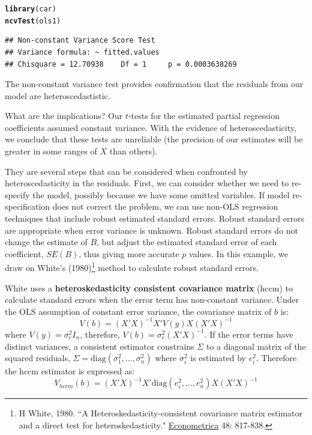 \documentclass[11pt,openany]{book}
\makeatletter
\newcommand{\hlstd}[1]{\textcolor[rgb]{0.345,0.345,0.345}{#1}}%
\newcommand{\hlkwd}[1]{\textcolor[rgb]{0.737,0.353,0.396}{\textbf{#1}}}%
\newenvironment{kframe}{%
 \def\at@end@of@kframe{}%
 \ifinner\ifhmode%
  \def\at@end@of@kframe{\end{minipage}}%
  \begin{minipage}{\columnwidth}%
 \fi\fi%
 \def\FrameCommand##1{\hskip\@totalleftmargin \hskip-\fboxsep
 \colorbox{shadecolor}{##1}\hskip-\fboxsep
     \hskip-\linewidth \hskip-\@totalleftmargin \hskip\columnwidth}%
 \MakeFramed {\advance\hsize-\width
   \@totalleftmargin\z@ \linewidth\hsize
   \@setminipage}}%
 {\par\unskip\endMakeFramed%
 \at@end@of@kframe}
\newenvironment{knitrout}{}{} %
\renewenvironment{knitrout}{\begin{singlespace}}{\end{singlespace}}
\makeatother
\begin{document}
\begin{knitrout}
\color{fgcolor}\begin{kframe}
\begin{alltt}
\hlkwd{library}\hlstd{(car)}
\hlkwd{ncvTest}\hlstd{(ols1)}
\end{alltt}
\begin{verbatim}
## Non-constant Variance Score Test 
## Variance formula: ~ fitted.values 
## Chisquare = 12.70938    Df = 1     p = 0.0003638269
\end{verbatim}
\end{kframe}
\end{knitrout}
\noindent The non-constant variance test provides confirmation that the residuals from our model are heteroscedastistic.

What are the implications? Our $t$-tests for the estimated partial regression  coefficients assumed constant variance. With the evidence of heteroscedasticity, we conclude that these tests are unreliable (the precision of our estimates will be greater in some ranges of $X$ than others). 

They are several steps that can be considered when confronted by heteroscedasticity in the residuals. First, we can consider whether we need to re-specify the model, possibly because we have some omitted variables. If model re-specification does not correct the problem, we can use non-OLS regression techniques that include robust estimated  standard errors.  Robust standard errors are appropriate when error variance is unknown. Robust standard errors do not change the estimate of $B$, but adjust the estimated standard error of each coefficient, $SE(B)$, thus giving more accurate $p$ values. In this example, we draw on White's (1980)\footnote{H White,  1980.  ``A Heteroskedasticity-consistent covariance matrix estimator and a direct test for heteroskedasticity." \underline{Econometrica} 48: 817-838.} method to calculate robust standard errors.  

White uses a \textbf{heteroskedasticity consistent covariance matrix} (hccm) to calculate standard errors when the error term has non-constant variance. Under the OLS assumption of constant error variance, the covariance matrix of $b$ is:
\begin{equation*}
  V(b) = (X'X)^{-1} X'V(y)X(X'X)^{-1}
\end{equation*}
\noindent where $V(y)=\sigma^{2}_{e}I_n$, therefore,
$V(b)=\sigma^{2}_{e}(X'X)^{-1}$. If the error terms have distinct
variances, a consistent estimator constrains $\Sigma$ to a diagonal
matrix of the squared residuals,
$\Sigma=\text{diag}(\sigma^2_1,\ldots,\sigma^2_n)$ where $\sigma^2_i$
is estimated by $e^2_i$. Therefore the hccm estimator is expressed as:  
\begin{equation*}
 V_{hccm}(b) = (X'X)^{-1} X'\text{diag}(e^2_i,\ldots,e^2_n) X(X'X)^{-1} 
\end{equation*}
\end{document}

